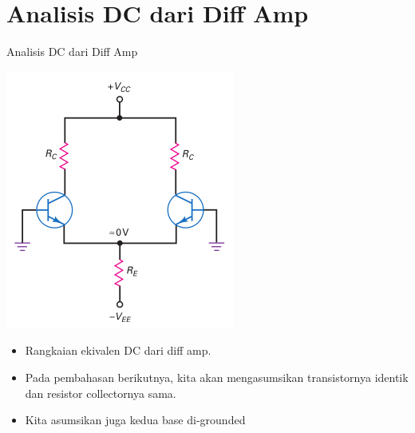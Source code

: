 \documentclass[aspectratio=169]{beamer}
\begin{document}
\section{Analisis DC dari Diff Amp}
\begin{frame}{Analisis DC dari Diff Amp}
	\begin{multicols}{2}
		\begin{center}
			\includegraphics[width=0.7\textheight]{gambar/01.ideal_dc_analysis}
		\end{center}
		\columnbreak
		\begin{itemize}
			\item Rangkaian ekivalen DC dari diff amp.
			\item Pada pembahasan berikutnya, kita akan mengasumsikan transistornya identik dan resistor collectornya sama.
			\item Kita asumsikan juga kedua base di-grounded
		\end{itemize}
	\end{multicols}
\end{frame}
\end{document}
